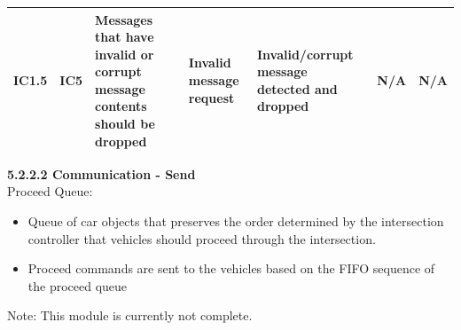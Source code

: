 \documentclass [10pt]{article}
\begin{document}
\begin{longtable}{ | p{ } | p{ } |  p{ } |  p{ } | p{ } | p{ } |  p{ } |}
    
    \multicolumn{1}{|c|}{IC1.5} 
    & \multicolumn{1}{c|}{IC5}
    & Messages that have invalid or corrupt message contents should be dropped
    & Invalid message \newline request
    & Invalid/corrupt message detected and dropped
    & N/A
    & \multicolumn{1}{|c|}{N/A}\\ \hline
     
    \end{longtable}
    
    \textbf{5.2.2.2 Communication - Send}  \\ 
    
    Proceed Queue:
\begin{itemize}[topsep=0pt]
    \itemsep -3pt
    \item Queue of car objects that preserves the order determined by the intersection controller that vehicles should proceed through the intersection. 
    \item Proceed commands are sent to the vehicles based on the FIFO sequence of the proceed queue\\
\end{itemize}

    Note: This module is currently not complete.\\
    
\end{document}
